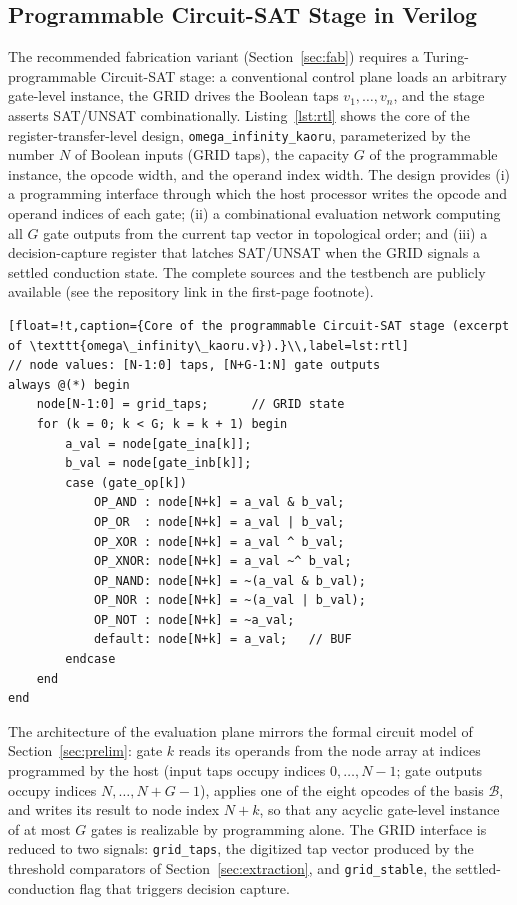 \documentclass[letterpaper,journal]{IEEEtran}
\begin{document}
\subsection{Programmable Circuit-SAT Stage in Verilog}
The recommended fabrication variant (Section~\ref{sec:fab}) requires a
Turing-programmable Circuit-SAT stage: a conventional control plane loads
an arbitrary gate-level instance, the GRID drives the Boolean taps
$v_1,\dots,v_n$, and the stage asserts SAT/UNSAT combinationally.
Listing~\ref{lst:rtl} shows the core of the register-transfer-level design,
\texttt{omega\_infinity\_kaoru}, parameterized by the number $N$ of Boolean
inputs (GRID taps), the capacity $G$ of the programmable instance, the
opcode width, and the operand index width. The design provides (i) a
programming interface through which the host processor writes the opcode
and operand indices of each gate; (ii) a combinational evaluation network
computing all $G$ gate outputs from the current tap vector in topological
order; and (iii) a decision-capture register that latches SAT/UNSAT when
the GRID signals a settled conduction state. The complete sources and the
testbench are publicly available (see the repository link in the first-page
footnote).

\begin{lstlisting}[float=!t,caption={Core of the programmable Circuit-SAT stage (excerpt of \texttt{omega\_infinity\_kaoru.v}).}\\,label=lst:rtl]
// node values: [N-1:0] taps, [N+G-1:N] gate outputs
always @(*) begin
    node[N-1:0] = grid_taps;      // GRID state
    for (k = 0; k < G; k = k + 1) begin
        a_val = node[gate_ina[k]];
        b_val = node[gate_inb[k]];
        case (gate_op[k])
            OP_AND : node[N+k] = a_val & b_val;
            OP_OR  : node[N+k] = a_val | b_val;
            OP_XOR : node[N+k] = a_val ^ b_val;
            OP_XNOR: node[N+k] = a_val ~^ b_val;
            OP_NAND: node[N+k] = ~(a_val & b_val);
            OP_NOR : node[N+k] = ~(a_val | b_val);
            OP_NOT : node[N+k] = ~a_val;
            default: node[N+k] = a_val;   // BUF
        endcase
    end
end
\end{lstlisting}

The architecture of the evaluation plane mirrors the formal circuit model
of Section~\ref{sec:prelim}: gate $k$ reads its operands from the node
array at indices programmed by the host (input taps occupy indices
$0,\dots,N-1$; gate outputs occupy indices $N,\dots,N+G-1$), applies one of
the eight opcodes of the basis $\mathcal{B}$, and writes its result to node
index $N+k$, so that any acyclic gate-level instance of at most $G$ gates
is realizable by programming alone. The GRID interface is reduced to two
signals: \texttt{grid\_taps}, the digitized tap vector produced by the
threshold comparators of Section~\ref{sec:extraction}, and
\texttt{grid\_stable}, the settled-conduction flag that triggers decision
capture.
\end{document}
